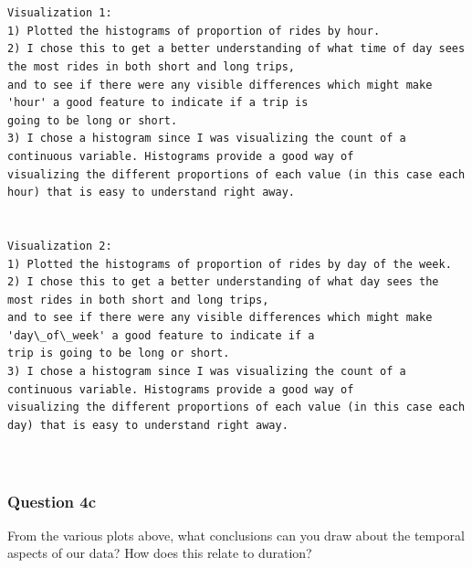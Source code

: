 \documentclass[11pt]{article}
\begin{document}
    \begin{Verbatim}[commandchars=\\\{\}]


Visualization 1:
1) Plotted the histograms of proportion of rides by hour. 
2) I chose this to get a better understanding of what time of day sees the most rides in both short and long trips,
and to see if there were any visible differences which might make 'hour' a good feature to indicate if a trip is 
going to be long or short.
3) I chose a histogram since I was visualizing the count of a continuous variable. Histograms provide a good way of
visualizing the different proportions of each value (in this case each hour) that is easy to understand right away.


Visualization 2:
1) Plotted the histograms of proportion of rides by day of the week. 
2) I chose this to get a better understanding of what day sees the most rides in both short and long trips,
and to see if there were any visible differences which might make 'day\_of\_week' a good feature to indicate if a 
trip is going to be long or short.
3) I chose a histogram since I was visualizing the count of a continuous variable. Histograms provide a good way of
visualizing the different proportions of each value (in this case each day) that is easy to understand right away. 



    \end{Verbatim}

    \subsubsection{Question 4c}\label{question-4c}

From the various plots above, what conclusions can you draw about the
temporal aspects of our data? How does this relate to duration?
\end{document}
